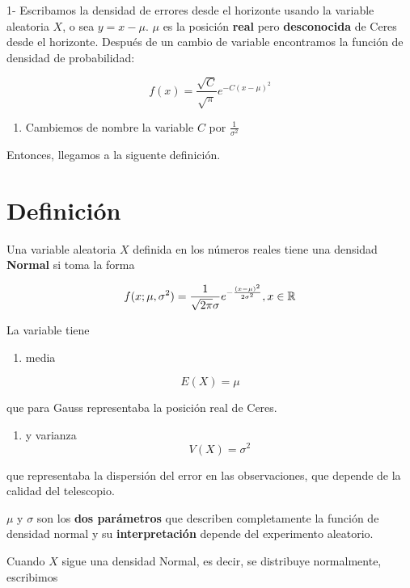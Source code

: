 \documentclass[
]{book}
\providecommand{\tightlist}{%
  \setlength{\itemsep}{0pt}\setlength{\parskip}{0pt}}
\begin{document}
1- Escribamos la densidad de errores desde el horizonte usando la variable aleatoria \(X\), o sea \(y=x-\mu\). \(\mu\) es la posición \textbf{real} pero \textbf{desconocida} de Ceres desde el horizonte. Después de un cambio de variable encontramos la función de densidad de probabilidad:

\[f(x)=\frac{\sqrt{C}}{\sqrt{\pi}}e^{-C(x-\mu)^2}\]

\begin{enumerate}
\def\labelenumi{\arabic{enumi})}
\setcounter{enumi}{1}
\tightlist
\item
  Cambiemos de nombre la variable \(C\) por \(\frac{1}{\sigma^2}\)
\end{enumerate}

Entonces, llegamos a la siguente definición.

\hypertarget{definiciuxf3n}{%
\section{Definición}\label{definiciuxf3n}}

Una variable aleatoria \(X\) definida en los números reales tiene una densidad \textbf{Normal} si toma la forma

\[f(x; \mu, \sigma^2)=\frac{1}{\sqrt{2\pi}\sigma}e^{-\frac{(x-\mu)^2}{2\sigma^2}}, x \in {\Bbb R}\]

La variable tiene

\begin{enumerate}
\def\labelenumi{\arabic{enumi})}
\tightlist
\item
  media
\end{enumerate}

\[E(X) = \mu\]

que para Gauss representaba la posición real de Ceres.

\begin{enumerate}
\def\labelenumi{\arabic{enumi})}
\setcounter{enumi}{1}
\tightlist
\item
  y varianza
  \[V (X) = \sigma^2\]
\end{enumerate}

que representaba la dispersión del error en las observaciones, que depende de la calidad del telescopio.

\(\mu\) y \(\sigma\) son los \textbf{dos parámetros} que describen completamente la función de densidad normal y su \textbf{interpretación} depende del experimento aleatorio.

Cuando \(X\) sigue una densidad Normal, es decir, se distribuye normalmente, escribimos
\end{document}
